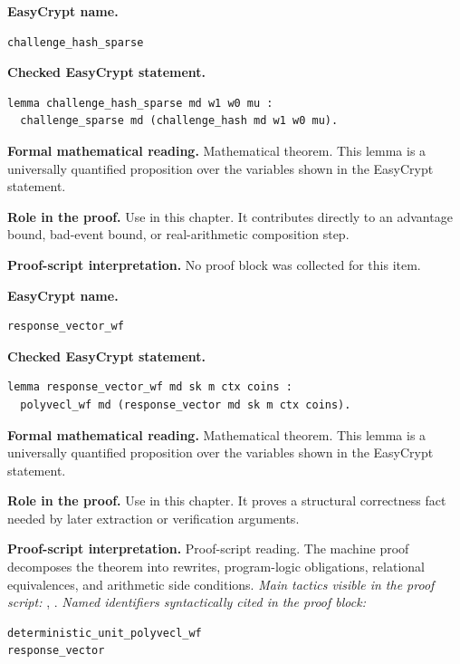 \begin{formaltheorem}
\noindent\textbf{EasyCrypt name.}
\begin{lstlisting}[language=EasyCrypt,basicstyle=\ttfamily\scriptsize]
challenge_hash_sparse
\end{lstlisting}
\noindent\textbf{Checked EasyCrypt statement.}
\begin{lstlisting}[language=EasyCrypt,basicstyle=\ttfamily\scriptsize]
lemma challenge_hash_sparse md w1 w0 mu :
  challenge_sparse md (challenge_hash md w1 w0 mu).
\end{lstlisting}
\noindent\textbf{Formal mathematical reading.}
Mathematical theorem. This lemma is a universally quantified proposition over the variables shown in the EasyCrypt statement.

\noindent\textbf{Role in the proof.}
Use in this chapter. It contributes directly to an advantage bound, bad-event bound, or real-arithmetic composition step.

\noindent\textbf{Proof-script interpretation.}
No proof block was collected for this item.

\end{formaltheorem}

\begin{formaltheorem}
\noindent\textbf{EasyCrypt name.}
\begin{lstlisting}[language=EasyCrypt,basicstyle=\ttfamily\scriptsize]
response_vector_wf
\end{lstlisting}
\noindent\textbf{Checked EasyCrypt statement.}
\begin{lstlisting}[language=EasyCrypt,basicstyle=\ttfamily\scriptsize]
lemma response_vector_wf md sk m ctx coins :
  polyvecl_wf md (response_vector md sk m ctx coins).
\end{lstlisting}
\noindent\textbf{Formal mathematical reading.}
Mathematical theorem. This lemma is a universally quantified proposition over the variables shown in the EasyCrypt statement.

\noindent\textbf{Role in the proof.}
Use in this chapter. It proves a structural correctness fact needed by later extraction or verification arguments.

\noindent\textbf{Proof-script interpretation.}
Proof-script reading. The machine proof decomposes the theorem into rewrites, program-logic obligations, relational equivalences, and arithmetic side conditions.
\emph{Main tactics visible in the proof script:} , .
\emph{Named identifiers syntactically cited in the proof block:}
\begin{lstlisting}[language=EasyCrypt,basicstyle=\ttfamily\scriptsize]
deterministic_unit_polyvecl_wf
response_vector
\end{lstlisting}

\end{formaltheorem}

